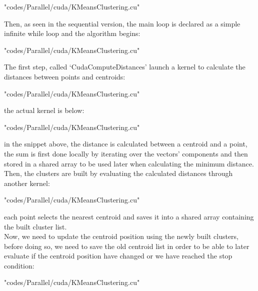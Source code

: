 \documentclass[10pt,twocolumn,letterpaper]{article}
\begin{document}
\begin{lstinputlisting}[language=C,style=CSnippetStyle,caption=CUDA Main Initialization Code,firstline=272,lastline=280]{
	"codes/Parallel/cuda/KMeansClustering.cu"}
\end{lstinputlisting}
Then, as seen in the sequential version, the main loop is declared as a simple infinite while loop and the algorithm begins:\\
\begin{lstinputlisting}[language=C,style=CSnippetStyle,caption=CUDA Main Loop,firstline=284,lastline=295]{
	"codes/Parallel/cuda/KMeansClustering.cu"}
\end{lstinputlisting}
The first step, called `CudaComputeDistances' launch a kernel to calculate the distances between points and centroids:
\begin{lstinputlisting}[language=C,style=CSnippetStyle,caption=CUDA Distance Calculator Kernel Launcher,firstline=132,lastline=141]{
	"codes/Parallel/cuda/KMeansClustering.cu"}
\end{lstinputlisting}
the actual kernel is below:\\
\begin{lstinputlisting}[language=C,style=CSnippetStyle,caption=CUDA Distance Calculator Kernel,firstline=81,lastline=103]{
	"codes/Parallel/cuda/KMeansClustering.cu"}
\end{lstinputlisting}
in the snippet above, the distance is calculated between a centroid and a point, the sum is first done locally by iterating over the 
vectors' components and then stored in a shared array to be used later when calculating the minimum distance.\\
Then, the clusters are built by evaluating the calculated distances through another kernel:\\
\begin{lstinputlisting}[language=C,style=CSnippetStyle,caption=CUDA Cluster Builder Kernel,firstline=60,lastline=79]{
	"codes/Parallel/cuda/KMeansClustering.cu"}
\end{lstinputlisting}
each point selects the nearest centroid and saves it into a shared array containing the built cluster list.\\
Now, we need to update the centroid position using the newly built clusters, before doing so, we need to save the old centroid list in
order to be able to later evaluate if the centroid position have changed or we have reached the stop condition:\\
\begin{lstinputlisting}[language=C,style=CSnippetStyle,caption=CUDA Centroid List Backup,firstline=287,lastline=287]{
	"codes/Parallel/cuda/KMeansClustering.cu"}
\end{lstinputlisting}
\end{document}
